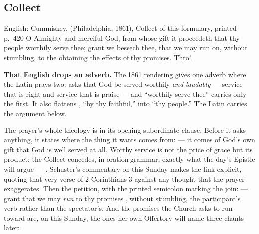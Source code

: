 \subsection*{Collect }


\begin{namedtranslation}{English: Cummiskey,  (Philadelphia, 1861), Collect of this formulary, printed p.~420}
O Almighty and merciful God, from whose gift it proceedeth that thy people
worthily serve thee; grant we beseech thee, that we may run on, without
stumbling, to the obtaining the effects of thy promises. Thro'.
\end{namedtranslation}

\textbf{That English drops an adverb.} The 1861 rendering gives one adverb where the Latin prays two:  asks that God be served worthily \textit{and
laudably} --- service that is right and service that is praise --- and
``worthily serve thee'' carries only the first. It also flattens , ``by thy faithful,'' into ``thy people.'' The Latin carries
the argument below.

The prayer's whole theology is in its opening subordinate clause. Before it
asks anything, it states where the thing it wants comes from:  ---
it comes of God's own gift that God is well served at all. Worthy service is
not the price of grace but its product; the Collect concedes, in oration
grammar, exactly what the day's Epistle will argue --- . Schuster's commentary on this Sunday makes the link explicit,
quoting that very verse of 2 Corinthians 3 against any thought that the
prayer exaggerates. Then the petition, with the printed semicolon marking
the join:  --- grant that we may \textit{run} to thy promises
, without stumbling, the participant's verb rather
than the spectator's. And the promises the Church asks to run toward are, on
this Sunday, the ones her own Offertory will name three chants later:
.

